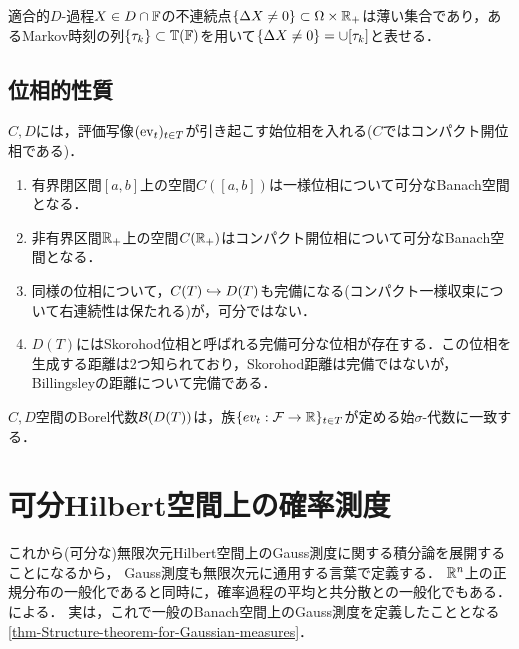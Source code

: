 \documentclass[uplatex,dvipdfmx]{jsreport}
\begin{document}
\begin{theorem}
    適合的$D$-過程$X\in D\cap\mathbb{F}$の不連続点$\left\{\Delta X\ne0\right\}\subset\Omega\times\mathbb{R}_+$は薄い集合であり，あるMarkov時刻の列$\{\tau_k\}\subset\mathbb{T}(\mathbb{F})$を用いて$\left\{\Delta X\ne0\right\}=\cup[\tau_k]$と表せる．
\end{theorem}

\subsection{位相的性質}

\begin{tcolorbox}[colframe=ForestGreen, colback=ForestGreen!10!white,breakable,colbacktitle=ForestGreen!40!white,coltitle=black,fonttitle=\bfseries\sffamily,
title=]
    $C,D$には，評価写像$(\mathrm{ev}_t)_{t\in T}$が引き起こす始位相を入れる($C$ではコンパクト開位相である)．

\end{tcolorbox}

\begin{enumerate}
    \item 有界閉区間$[a,b]$上の空間$C([a,b])$は一様位相について可分なBanach空間となる．
    \item 非有界区間$\mathbb{R}_+$上の空間$C(\mathbb{R}_+)$はコンパクト開位相について可分なBanach空間となる．
    \item 同様の位相について，$C(T)\hookrightarrow D(T)$も完備になる(コンパクト一様収束について右連続性は保たれる)が，可分ではない．
    \item $D(T)$にはSkorohod位相と呼ばれる完備可分な位相が存在する．この位相を生成する距離は2つ知られており，Skorohod距離は完備ではないが，Billingsleyの距離について完備である．
\end{enumerate}

\begin{theorem}
    $C,D$空間のBorel代数$\mathcal{B}(D(T))$は，族$\{ev_t:\mathcal{F}\to\mathbb{R}\}_{t\in T}$が定める始$\sigma$-代数に一致する．
\end{theorem}

\section{可分Hilbert空間上の確率測度}

\begin{tcolorbox}[colframe=ForestGreen, colback=ForestGreen!10!white,breakable,colbacktitle=ForestGreen!40!white,coltitle=black,fonttitle=\bfseries\sffamily,
title=]
    これから(可分な)無限次元Hilbert空間上のGauss測度に関する積分論を展開することになるから，
    Gauss測度も無限次元に通用する言葉で定義する．
    $\mathbb{R}^n$上の正規分布の一般化であると同時に，確率過程の平均と共分散との一般化でもある．
    \cite{Prato}による．
    実は，これで一般のBanach空間上のGauss測度を定義したこととなる\ref{thm-Structure-theorem-for-Gaussian-measures}．
\end{tcolorbox}
\end{document}

